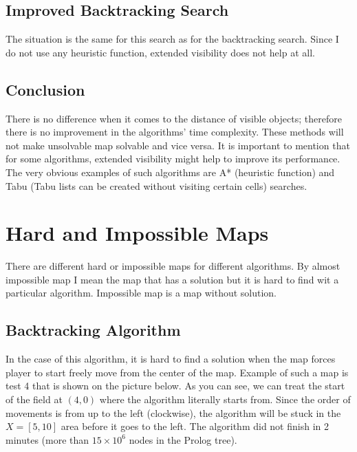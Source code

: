 \documentclass{article}
\begin{document}
\subsection{Improved Backtracking Search}
The situation is the same for this search as for the backtracking search. Since I do not use any heuristic function, extended visibility does not help at all.
\subsection{Conclusion}
There is no difference when it comes to the distance of visible objects; therefore there is no improvement in the algorithms' time complexity. These methods will not make unsolvable map solvable and vice versa.
It is important to mention that for some algorithms, extended visibility might help to improve its performance. The very obvious examples of such algorithms are A* (heuristic function) and Tabu (Tabu lists can be created without visiting certain cells) searches.

\section{Hard and Impossible Maps}
\label{section:impossible-maps}
There are different hard or impossible maps for different algorithms. 
By almost impossible map I mean the map that has a solution but it is hard to find wit a particular algorithm. Impossible map is a map without solution.
\subsection{Backtracking Algorithm}
In the case of this algorithm, it is hard to find a solution when the map forces player to start freely move from the center of the map. Example of such a map is test 4 that is shown on the picture below. As you can see, we can treat the start of the field at $(4, 0)$ where the algorithm literally starts from. Since the order of movements is from up to the left (clockwise), the algorithm will be stuck in the $X = [5, 10]$ area before it goes to the left. The algorithm did not finish in 2 minutes (more than $15 \times 10^6$ nodes in the Prolog tree).
\end{document}
